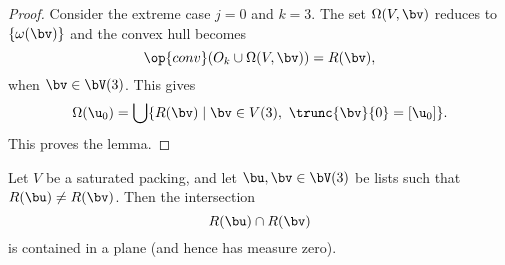 \begin{proof}
Consider  the extreme case $j=0$ and $k=3$.  The set $\Omega(V,\bv)$
reduces to $\{\omega(\bv)\}$  and the convex hull becomes
\begin{displaymath} 
\op{conv}(O_{k}\cup \Omega(V,\bv)) = R(\bv),
\end{displaymath}
when $\bv\in \bV(3)$.
This gives
\begin{equation} 
\Omega(\u_0) = \bigcup \{ R(\bv) \mid \bv\in V(3),~\trunc{\bv}{0} =[\u_0]\}.
\end{equation}
This proves the lemma.
\end{proof}



\begin{lemma}[]  \label{lemma:R-inter} 
Let $V$ be a saturated packing, and let $\bu,\bv\in \bV(3)$ be lists such that 
$R(\bu)\ne R(\bv)$.  Then the intersection 
\begin{displaymath} 
R(\bu)\cap R(\bv)
\end{displaymath}
is contained in a plane (and hence has measure zero).
\end{lemma}

